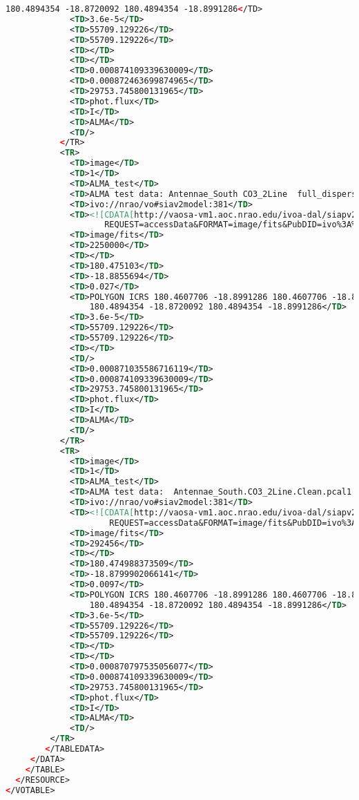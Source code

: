 \documentclass[11pt,a4paper]{ivoa}
\begin{document}
\begin{lstlisting}[basicstyle=\scriptsize,language=XML]
                 180.4894354 -18.8720092 180.4894354 -18.8991286</TD>
             <TD>3.6e-5</TD>
             <TD>55709.129226</TD>
             <TD>55709.129226</TD>
             <TD></TD>
             <TD></TD>
             <TD>0.000874109339630009</TD>
             <TD>0.000872463699874965</TD>
             <TD>29753.745800131965</TD>
             <TD>phot.flux</TD>
             <TD>I</TD>
             <TD>ALMA</TD>
             <TD/>
           </TR>
           <TR>
             <TD>image</TD>
             <TD>1</TD>
             <TD>ALMA_test</TD>
             <TD>ALMA test data: Antennae_South CO3_2Line  full_dispersion_map</TD>
             <TD>ivo://nrao/vo#siav2model:381</TD>
             <TD><![CDATA[http://vaosa-vm1.aoc.nrao.edu/ivoa-dal/siapv2-vao/sync?
                    REQUEST=accessData&FORMAT=image/fits&PubDID=ivo%3A%2F%2Fnrao%2Fvo%23siav2model%3A381]]></TD>
             <TD>image/fits</TD>
             <TD>2250000</TD>
             <TD></TD>
             <TD>180.475103</TD>
             <TD>-18.8855694</TD>
             <TD>0.027</TD>
             <TD>POLYGON ICRS 180.4607706 -18.8991286 180.4607706 -18.8720092
                 180.4894354 -18.8720092 180.4894354 -18.8991286</TD>
             <TD>3.6e-5</TD>
             <TD>55709.129226</TD>
             <TD>55709.129226</TD>
             <TD></TD>
             <TD/>
             <TD>0.000871035586716119</TD>
             <TD>0.000874109339630009</TD>
             <TD>29753.745800131965</TD>
             <TD>phot.flux</TD>
             <TD>I</TD>
             <TD>ALMA</TD>
             <TD/>
           </TR>
           <TR>
             <TD>image</TD>
             <TD>1</TD>
             <TD>ALMA_test</TD>
             <TD>ALMA test data:  Antennae_South.CO3_2Line.Clean.pcal1.image.mom.weighted_dispersion_coord.fits</TD>
             <TD>ivo://nrao/vo#siav2model:381</TD>
             <TD><![CDATA[http://vaosa-vm1.aoc.nrao.edu/ivoa-dal/siapv2-vao/sync?
                     REQUEST=accessData&FORMAT=image/fits&PubDID=ivo%3A%2F%2Fnrao%2Fvo%23image-ByCXy3]]></TD>
             <TD>image/fits</TD>
             <TD>292456</TD>
             <TD></TD>
             <TD>180.474988373509</TD>
             <TD>-18.8799902066141</TD>
             <TD>0.0097</TD>
             <TD>POLYGON ICRS 180.4607706 -18.8991286 180.4607706 -18.8720092
                 180.4894354 -18.8720092 180.4894354 -18.8991286</TD>
             <TD>3.6e-5</TD>
             <TD>55709.129226</TD>
             <TD>55709.129226</TD>
             <TD></TD>
             <TD></TD>
             <TD>0.000870797535056077</TD>
             <TD>0.000874109339630009</TD>
             <TD>29753.745800131965</TD>
             <TD>phot.flux</TD>
             <TD>I</TD>
             <TD>ALMA</TD>
             <TD/>
         </TR>
        </TABLEDATA>
     </DATA>
    </TABLE>
  </RESOURCE>
</VOTABLE>
\end{lstlisting}
\appendix
\end{document}
